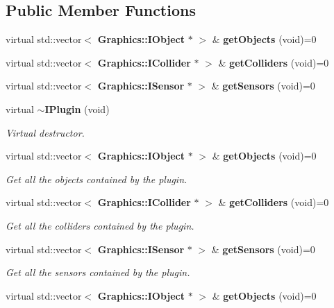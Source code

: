 \subsection*{Public Member Functions}
\begin{DoxyCompactItemize}
\item 
virtual std\+::vector$<$ {\bf Graphics\+::\+I\+Object} $\ast$ $>$ \& {\bfseries get\+Objects} (void)=0\label{class_plugin_1_1_i_plugin_a87377dd4f3374d0cfe688af7bda54fc6}

\item 
virtual std\+::vector$<$ {\bf Graphics\+::\+I\+Collider} $\ast$ $>$ \& {\bfseries get\+Colliders} (void)=0\label{class_plugin_1_1_i_plugin_a33a2f401e72044222692bd0dd2f93c3b}

\item 
virtual std\+::vector$<$ {\bf Graphics\+::\+I\+Sensor} $\ast$ $>$ \& {\bfseries get\+Sensors} (void)=0\label{class_plugin_1_1_i_plugin_af37b47e4aeb1b3c457cb58328b83b314}

\item 
virtual {\bf $\sim$\+I\+Plugin} (void)\label{class_plugin_1_1_i_plugin_a8eb9b11fde2be5b2aef3aa4a68979319}

\begin{DoxyCompactList}\small\item\em Virtual destructor. \end{DoxyCompactList}\item 
virtual std\+::vector$<$ {\bf Graphics\+::\+I\+Object} $\ast$ $>$ \& {\bf get\+Objects} (void)=0
\begin{DoxyCompactList}\small\item\em Get all the objects contained by the plugin. \end{DoxyCompactList}\item 
virtual std\+::vector$<$ {\bf Graphics\+::\+I\+Collider} $\ast$ $>$ \& {\bf get\+Colliders} (void)=0
\begin{DoxyCompactList}\small\item\em Get all the colliders contained by the plugin. \end{DoxyCompactList}\item 
virtual std\+::vector$<$ {\bf Graphics\+::\+I\+Sensor} $\ast$ $>$ \& {\bf get\+Sensors} (void)=0
\begin{DoxyCompactList}\small\item\em Get all the sensors contained by the plugin. \end{DoxyCompactList}\item 
virtual std\+::vector$<$ {\bf Graphics\+::\+I\+Object} $\ast$ $>$ \& {\bfseries get\+Objects} (void)=0\label{class_plugin_1_1_i_plugin_a87377dd4f3374d0cfe688af7bda54fc6}


\end{DoxyCompactItemize}
